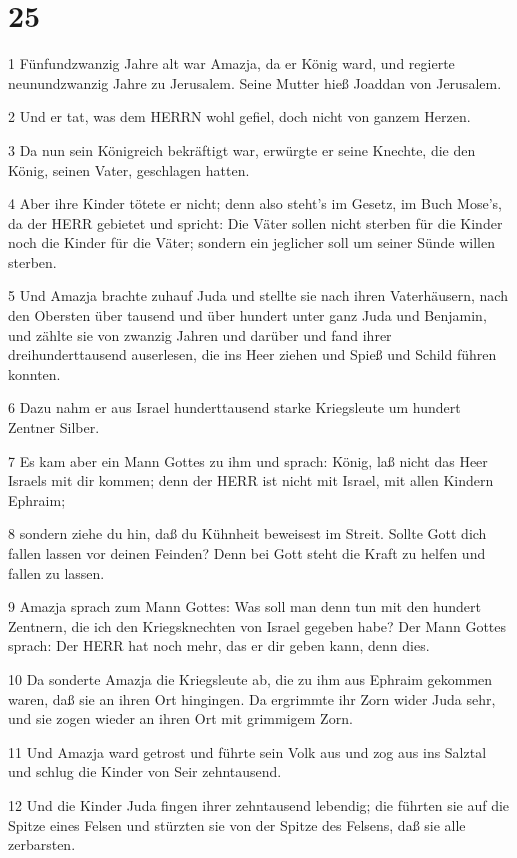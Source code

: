 \chapter{25}

\par 1 Fünfundzwanzig Jahre alt war Amazja, da er König ward, und regierte neunundzwanzig Jahre zu Jerusalem. Seine Mutter hieß Joaddan von Jerusalem.
\par 2 Und er tat, was dem HERRN wohl gefiel, doch nicht von ganzem Herzen.
\par 3 Da nun sein Königreich bekräftigt war, erwürgte er seine Knechte, die den König, seinen Vater, geschlagen hatten.
\par 4 Aber ihre Kinder tötete er nicht; denn also steht's im Gesetz, im Buch Mose's, da der HERR gebietet und spricht: Die Väter sollen nicht sterben für die Kinder noch die Kinder für die Väter; sondern ein jeglicher soll um seiner Sünde willen sterben.
\par 5 Und Amazja brachte zuhauf Juda und stellte sie nach ihren Vaterhäusern, nach den Obersten über tausend und über hundert unter ganz Juda und Benjamin, und zählte sie von zwanzig Jahren und darüber und fand ihrer dreihunderttausend auserlesen, die ins Heer ziehen und Spieß und Schild führen konnten.
\par 6 Dazu nahm er aus Israel hunderttausend starke Kriegsleute um hundert Zentner Silber.
\par 7 Es kam aber ein Mann Gottes zu ihm und sprach: König, laß nicht das Heer Israels mit dir kommen; denn der HERR ist nicht mit Israel, mit allen Kindern Ephraim;
\par 8 sondern ziehe du hin, daß du Kühnheit beweisest im Streit. Sollte Gott dich fallen lassen vor deinen Feinden? Denn bei Gott steht die Kraft zu helfen und fallen zu lassen.
\par 9 Amazja sprach zum Mann Gottes: Was soll man denn tun mit den hundert Zentnern, die ich den Kriegsknechten von Israel gegeben habe? Der Mann Gottes sprach: Der HERR hat noch mehr, das er dir geben kann, denn dies.
\par 10 Da sonderte Amazja die Kriegsleute ab, die zu ihm aus Ephraim gekommen waren, daß sie an ihren Ort hingingen. Da ergrimmte ihr Zorn wider Juda sehr, und sie zogen wieder an ihren Ort mit grimmigem Zorn.
\par 11 Und Amazja ward getrost und führte sein Volk aus und zog aus ins Salztal und schlug die Kinder von Seir zehntausend.
\par 12 Und die Kinder Juda fingen ihrer zehntausend lebendig; die führten sie auf die Spitze eines Felsen und stürzten sie von der Spitze des Felsens, daß sie alle zerbarsten.
